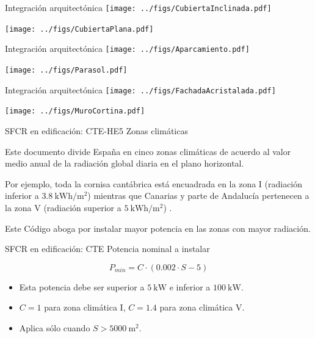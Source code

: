 \documentclass[xcolor={usenames,svgnames,dvipsnames}]{beamer}
\begin{document}
\begin{frame}[label=sec-1-0-13]{Integración arquitectónica}
\texttt{[image: ../figs/CubiertaInclinada.pdf]}

\texttt{[image: ../figs/CubiertaPlana.pdf]}
\end{frame}

\begin{frame}[label=sec-1-0-14]{Integración arquitectónica}
\texttt{[image: ../figs/Aparcamiento.pdf]}

\texttt{[image: ../figs/Parasol.pdf]}
\end{frame}

\begin{frame}[label=sec-1-0-15]{Integración arquitectónica}
\texttt{[image: ../figs/FachadaAcristalada.pdf]}

\texttt{[image: ../figs/MuroCortina.pdf]}
\end{frame}

\begin{frame}[label=sec-1-0-16]{SFCR en edificación: CTE-HE5}
Zonas climáticas

Este documento divide España en cinco zonas climáticas de acuerdo al
valor medio anual de la radiación global diaria en el plano horizontal.

Por ejemplo, toda la cornisa cantábrica está encuadrada en la zona I
(radiación inferior a $\SI{3.8}{\kWh\per\meter\squared}$) mientras que
Canarias y parte de Andalucía pertenecen a la zona V (radiación superior
a $\SI{5}{\kWh\per\meter\squared}$) .

Este Código aboga por instalar mayor potencia en las zonas con mayor
radiación.
\end{frame}

\begin{frame}[label=sec-1-0-17]{SFCR en edificación: CTE}
Potencia \alert{nominal} a instalar

$$P_{min}=C\cdot(0.002\cdot S - 5)$$

\begin{itemize}
\item Esta potencia debe ser superior a $\SI{5}{\kilo\watt}$ e inferior a
$\SI{100}{\kilo\watt}$.

\item $C=1$ para zona climática I, $C=1.4$ para zona climática V.

\item Aplica sólo cuando $S > \SI{5000}{\meter\squared}$.
\end{itemize}
\end{frame}
\end{document}
